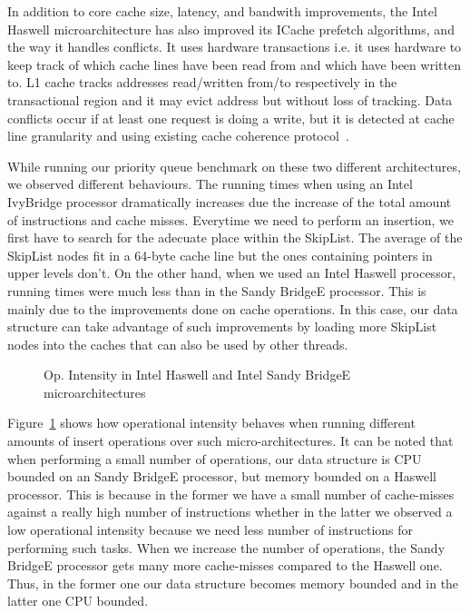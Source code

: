 In addition to core cache size, latency, and bandwith improvements, the Intel Haswell microarchitecture has also improved its ICache prefetch algorithms, and the way it handles conflicts. It uses hardware transactions i.e. it uses hardware to keep track of which cache lines have been read from and which have been written to. L1 cache tracks addresses read/written from/to respectively in the transactional region and it may evict address but without loss of tracking. Data conflicts occur if at least one request is doing a write, but it is detected at cache line granularity and using existing cache coherence protocol~\cite{rajwar_qconsf2012,dk_haswell}.

While running our priority queue benchmark on these two different architectures, we observed different behaviours. The running times when using an Intel IvyBridge processor dramatically increases due the increase of the total amount of instructions and cache misses. Everytime we need to perform an insertion, we first have to search for the adecuate place within the SkipList. The average of the SkipList nodes fit in a 64-byte cache line but the ones containing pointers in upper levels don't. On the other hand, when we used an Intel Haswell processor, running times were much less than in the Sandy BridgeE processor. This is mainly due to the improvements done on cache operations. In this case, our data structure can take advantage of such improvements by loading more SkipList nodes into the caches that can also be used by other threads.

\begin{figure}[t]
	\centering
	
	\caption{Op. Intensity in Intel Haswell and Intel Sandy BridgeE microarchitectures}
	\label{fig:haswell_ivybridge}
\end{figure}

Figure~\ref{fig:haswell_ivybridge} shows how operational intensity behaves when running different amounts of insert operations over such micro-architectures. It can be noted that when performing a small number of operations, our data structure is CPU bounded on an Sandy BridgeE processor, but memory bounded on a Haswell processor. This is because in the former we have a small number of cache-misses against a really high number of instructions whether in the latter we observed a low operational intensity because we need less number of instructions for performing such tasks. When we increase the number of operations, the Sandy BridgeE processor gets many more cache-misses compared to the Haswell one. Thus, in the former one our data structure becomes memory bounded and in the latter one CPU bounded.


